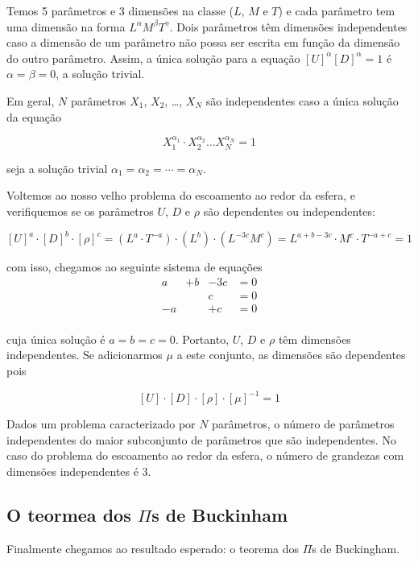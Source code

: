 Temos 5 parâmetros e 3 dimensões na classe ($L$, $M$ e $T$) e cada parâmetro tem uma dimensão na forma $L^\alpha M^\beta T^\gamma$. Dois parâmetros têm dimensões independentes caso a dimensão de um parâmetro não possa ser escrita em função da dimensão do outro parâmetro. Assim, a única solução para a equação $[U]^\alpha [D]^\alpha = 1$ é $\alpha = \beta = 0$, a solução trivial.

Em geral, $N$ parâmetros $X_1$, $X_2$, \ldots, $X_N$ são independentes caso a única solução da equação

\[
X_1^{\alpha_1} \cdot X_2^{\alpha_2} \ldots X_N^{\alpha_N} = 1
\]

seja a solução trivial $\alpha_1 = \alpha_2 = \cdots = \alpha_N$.

Voltemos ao nosso velho problema do escoamento ao redor da esfera, e verifiquemos se os parâmetros $U$, $D$ e $\rho$ são dependentes ou independentes:

\[
  [U]^a \cdot [D]^b \cdot [\rho]^c = (L^a \cdot T^{-a}) \cdot (L^b) \cdot (L^{-3c}M^c) =
  L^{a+b-3c}\cdot M^c \cdot T^{-a + c} = 1
\]

com isso, chegamos ao seguinte sistema de equações
\[
\begin{aligned}
  a &+ b &- 3c &= 0 \\
  & & c & = 0 \\
  -a & &+c & = 0\\
\end{aligned}
\]

cuja única solução é $a=b=c=0$. Portanto, $U$, $D$ e $\rho$ têm dimensões independentes. Se adicionarmos $\mu$ a este conjunto, as dimensões são dependentes pois

\[
  [U] \cdot [D] \cdot [\rho] \cdot [\mu]^{-1} = 1
\]

Dados um problema caracterizado por $N$ parâmetros, o número de parâmetros independentes do maior subconjunto de parâmetros que são independentes. No caso do problema do escoamento ao redor da esfera, o número de grandezas com dimensões independentes é 3.




  
  
\subsection{O teormea dos $\Pi$s de Buckinham}

Finalmente chegamos ao resultado esperado: o teorema dos $\Pi$s de Buckingham.

